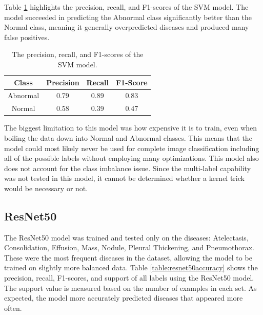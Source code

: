\documentclass{article}
\theoremstyle{plain}
\theoremstyle{definition}
\theoremstyle{remark}
\begin{document}
Table \ref{table:svmaccuracy} highlights the precision, recall, and F1-scores of the SVM model.
The model succeeded in predicting the Abnormal class significantly better than the Normal class,
meaning it generally overpredicted diseases and produced many false positives.

\begin{table}[!h]
    \centering
    \begin{tabular}{ c  c  c  c }
        \hline
        \textbf{Class} & \textbf{Precision} & \textbf{Recall} & \textbf{F1-Score} \\
        \hline
        Abnormal & 0.79 & 0.89 & 0.83 \\
        Normal & 0.58 & 0.39 & 0.47 \\
        \hline
    \end{tabular}
    \caption{The precision, recall, and F1-scores of the SVM model.}
    \label{table:svmaccuracy}
\end{table}

The biggest limitation to this model was how expensive it is to train, even when boiling the data
down into Normal and Abnormal classes. This means that the model could most likely never be used for
complete image classification including all of the possible labels without employing many
optimizations. This model also does not account for the class imbalance issue. Since the multi-label
capability was not tested in this model, it cannot be determined whether a kernel trick would be
necessary or not. 

\subsection{ResNet50}
\label{section:resultresnet50}
The ResNet50 model was trained and tested only on the diseases: Atelectasis, Consolidation,
Effusion, Mass, Nodule, Pleural Thickening, and Pneumothorax. These were the most frequent diseases
in the dataset, allowing the model to be trained on slightly more balanced data. Table
\ref{table:resnet50accuracy} shows the precision, recall, F1-scores, and support of all labels
using the ResNet50 model. The support value is measured based on the number of examples in each set. 
As expected, the model more accurately predicted diseases that appeared more often. 
\end{document}

